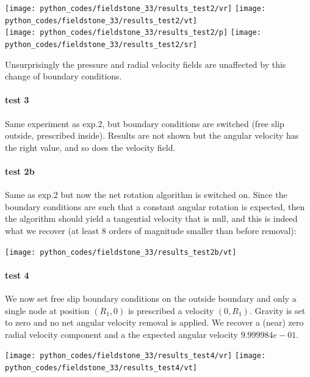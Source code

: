 \begin{center}
\texttt{[image: python\_codes/fieldstone\_33/results\_test2/vr]}
\texttt{[image: python\_codes/fieldstone\_33/results\_test2/vt]}\\
\texttt{[image: python\_codes/fieldstone\_33/results\_test2/p]}
\texttt{[image: python\_codes/fieldstone\_33/results\_test2/sr]}
\end{center}

Unsurprisingly the pressure and radial velocity fields are unaffected by this 
change of boundary conditions.

\paragraph{test 3} Same experiment as exp.2, but boundary conditions are switched
(free slip outside, prescribed inside).
Results are not shown but the angular velocity has the right value, and so does the 
velocity field. 


\paragraph{test 2b} Same as exp.2 but now the net rotation algorithm is switched on. 
Since the boundary conditions are such that a constant angular rotation is expected, 
then the algorithm should yield a tangential velocity that is null, and this is indeed
what we recover (at least 8 orders of magnitude smaller than before removal):

\begin{center}
\texttt{[image: python\_codes/fieldstone\_33/results\_test2b/vt]}
\end{center}

\paragraph{test 4} We now set free slip boundary conditions on the outside boundary and 
only a single node at position $(R_1,0)$ is prescribed a velocity $(0,R_1)$. Gravity is set to zero 
and no net angular velocity removal is applied.
We recover a (near) zero radial velocity component and a the expected angular velocity 
$9.999984e-01$. 

\begin{center}
\texttt{[image: python\_codes/fieldstone\_33/results\_test4/vr]}
\texttt{[image: python\_codes/fieldstone\_33/results\_test4/vt]}
\end{center}


